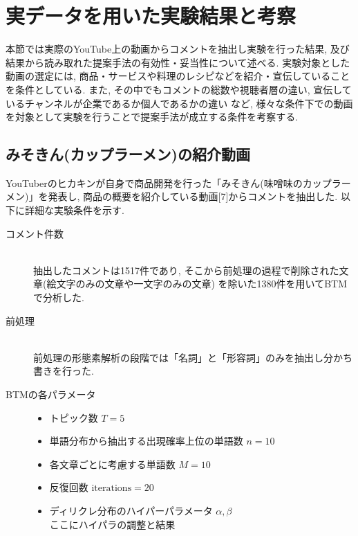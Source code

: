 \documentclass{ltjarticle}
\begin{document}
\section
{実データを用いた実験結果と考察}
本節では実際のYouTube上の動画からコメントを抽出し実験を行った結果, 及び結果から読み取れた提案手法の有効性・妥当性について述べる. 
実験対象とした動画の選定には, 商品・サービスや料理のレシピなどを紹介・宣伝していることを条件としている. 
また, その中でもコメントの総数や視聴者層の違い, 宣伝しているチャンネルが企業であるか個人であるかの違い
など, 様々な条件下での動画を対象として実験を行うことで提案手法が成立する条件を考察する. 
\subsection{みそきん(カップラーメン)の紹介動画}
YouTuberのヒカキンが自身で商品開発を行った「みそきん(味噌味のカップラーメン)」を発表し, 
商品の概要を紹介している動画[7]からコメントを抽出した. 
以下に詳細な実験条件を示す. 
\vspace{10truept}

\begin{description}
    \item[コメント件数]\mbox{}\\
    抽出したコメントは1517件であり, そこから前処理の過程で削除された文章(絵文字のみの文章や一文字のみの文章)
    を除いた1380件を用いてBTMで分析した. 
    \item[前処理] \mbox{}\\
    前処理の形態素解析の段階では「名詞」と「形容詞」のみを抽出し分かち書きを行った. 
    \item[BTMの各パラメータ]\mbox{}
    \begin{itemize}
        \item トピック数 $T=5$
        \item 単語分布から抽出する出現確率上位の単語数 $n = 10$
        \item 各文章ごとに考慮する単語数 $M=10$
        \item 反復回数 $\textrm{iterations} = 20$
        \item ディリクレ分布のハイパーパラメータ $\alpha, \beta$\\
        ここにハイパラの調整と結果
    \end{itemize}
\end{description}
\end{document}
